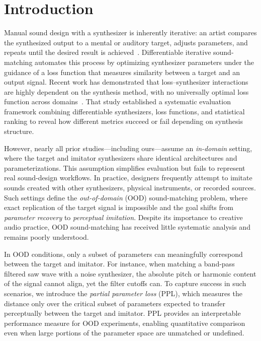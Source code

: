 \documentclass[runningheads]{llncs}
\begin{document}
\section{Introduction}
\label{sec:intro}
Manual sound design with a synthesizer is inherently iterative: an artist compares the synthesized output to a mental or auditory target, adjusts parameters, and repeats until the desired result is achieved~\cite{salimi2025soundmatching}.  
Differentiable iterative sound-matching automates this process by optimizing synthesizer parameters under the guidance of a loss function that measures similarity between a target and an output signal.  
Recent work has demonstrated that loss–synthesizer interactions are highly dependent on the synthesis method, with no universally optimal loss function across domains~\cite{salimi2025soundmatching}.  
That study established a systematic evaluation framework combining differentiable synthesizers, loss functions, and statistical ranking to reveal how different metrics succeed or fail depending on synthesis structure.

However, nearly all prior studies—including ours—assume an \emph{in-domain} setting, where the target and imitator synthesizers share identical architectures and parameterizations.  
This assumption simplifies evaluation but fails to represent real sound-design workflows.  
In practice, designers frequently attempt to imitate sounds created with other synthesizers, physical instruments, or recorded sources.  
Such settings define the \emph{out-of-domain} (OOD) sound-matching problem, where exact replication of the target signal is impossible and the goal shifts from \emph{parameter recovery} to \emph{perceptual imitation}.  
Despite its importance to creative audio practice, OOD sound-matching has received little systematic analysis and remains poorly understood.

In OOD conditions, only a subset of parameters can meaningfully correspond between the target and imitator.  
For instance, when matching a band-pass filtered saw wave with a noise synthesizer, the absolute pitch or harmonic content of the signal cannot align, yet the filter cutoffs can.  
To capture success in such scenarios, we introduce the \emph{partial parameter loss} (PPL), which measures the distance only over the critical subset of parameters expected to transfer perceptually between the target and imitator.  
PPL provides an interpretable performance measure for OOD experiments, enabling quantitative comparison even when large portions of the parameter space are unmatched or undefined.
\end{document}
